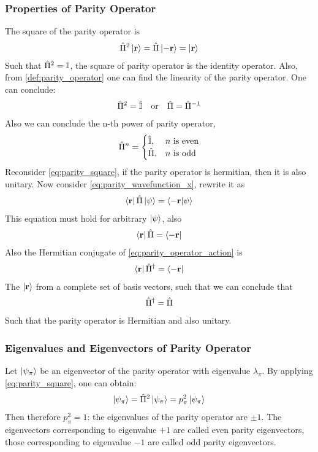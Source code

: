 \subsubsection{Properties of Parity Operator}
The square of the parity operator is 
\begin{align}
    \hat{\Pi}^2 \ket{\mathbf{r}} = \hat{\Pi} \ket{-\mathbf{r}} = \ket{\mathbf{r}} 
\end{align}
Such that $\hat{\Pi}^2 = \mathbb{I}$, the square of parity operator is the identity operator. Also, from \cref{def:parity_operator} one can find the linearity of the parity operator. One can conclude:
\begin{align}
    \hat{\Pi}^2 = \hat{\mathbb{I}} \quad \text{or} \quad \hat{\Pi} = \hat{\Pi}^{-1} \label{eq:parity_square}
\end{align}
Also we can conclude the n-th power of parity operator, 
\begin{align}
    \hat{\Pi}^n = \begin{cases}
        \hat{\mathbb{I}}, & n \text{ is even} \\
        \hat{\Pi}, & n \text{ is odd}
    \end{cases}
\end{align}
Reconsider \cref{eq:parity_square}, if the parity operator is hermitian, then it is also unitary. Now consider \cref{eq:parity_wavefunction_x}, rewrite it as 
\begin{align}
    \bra{\mathbf{r}} \hat{\Pi} \ket{\psi} = \braket{\mathbf{-r}|\psi} 
\end{align}
This equation must hold for arbitrary $\ket{\psi}$, also
\begin{align}
    \bra{\mathbf{r}}\hat{\Pi}  = \bra{\mathbf{-r}}
\end{align}
Also the Hermitian conjugate of \cref{eq:parity_operator_action} is 
\begin{align}
    \bra{\mathbf{r}} \hat{\Pi}^ \dag = \bra{-\mathbf{r}}
\end{align}
The $\ket{\mathbf{r}}$ from a complete set of basis vectors, such that we can conclude that
\begin{align}
    \hat{\Pi}^ \dag = \hat{\Pi}
\end{align}
Such that the parity operator is Hermitian and also unitary.
\subsubsection{Eigenvalues and Eigenvectors of Parity Operator}
Let $\ket{\psi_{\pi}}$ be an eigenvector of the parity operator with eigenvalue $\lambda_ \pi$. By applying \cref{eq:parity_square}, one can obtain: 
\begin{align}
    \ket{\psi_{\pi}} = \hat{\Pi}^2 \ket{\psi_{\pi}} = p_ \pi^2 \ket{\psi_{\pi}}
\end{align}
Then therefore $p_ \pi^2 = 1$: the eigenvalues of the parity operator are $\pm 1$. The eigenvectors corresponding to eigenvalue $+1$ are called even parity eigenvectors, those corresponding to eigenvalue $-1$ are called odd parity eigenvectors.

